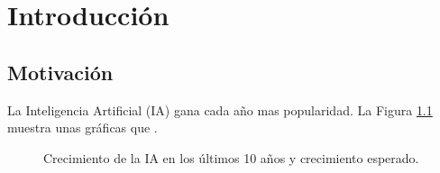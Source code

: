 \chapter{Introducción}

\section{Motivación}

La Inteligencia Artificial (IA) gana cada año mas popularidad. La Figura \ref{fig:ai_grow} muestra unas gráficas que \todo.

\begin{figure}[htb]
  \begin{subcaptiongroup}
  \begin{floatrow}
  \end{floatrow}
  \end{subcaptiongroup}
  \caption{Crecimiento de la IA en los últimos 10 años y crecimiento esperado.}%
  \label{fig:ai_grow}%
\end{figure}

